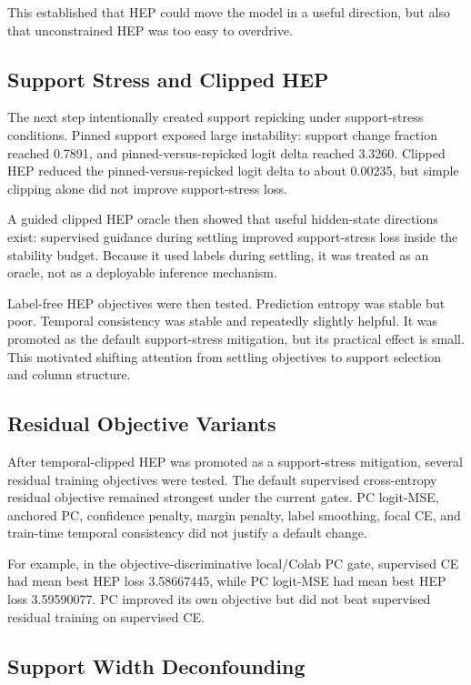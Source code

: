 \documentclass[11pt]{article}
\begin{document}
This established that HEP could move the model in a useful direction, but also
that unconstrained HEP was too easy to overdrive.

\subsection{Support Stress and Clipped HEP}

The next step intentionally created support repicking under support-stress
conditions. Pinned support exposed large instability: support change fraction
reached 0.7891, and pinned-versus-repicked logit delta reached 3.3260.
Clipped HEP reduced the pinned-versus-repicked logit delta to about 0.00235,
but simple clipping alone did not improve support-stress loss.

A guided clipped HEP oracle then showed that useful hidden-state directions
exist: supervised guidance during settling improved support-stress loss inside
the stability budget. Because it used labels during settling, it was treated as
an oracle, not as a deployable inference mechanism.

Label-free HEP objectives were then tested. Prediction entropy was stable but
poor. Temporal consistency was stable and repeatedly slightly helpful. It was
promoted as the default support-stress mitigation, but its practical effect is
small. This motivated shifting attention from settling objectives to support
selection and column structure.

\subsection{Residual Objective Variants}

After temporal-clipped HEP was promoted as a support-stress mitigation, several
residual training objectives were tested. The default supervised
cross-entropy residual objective remained strongest under the current gates.
PC logit-MSE, anchored PC, confidence penalty, margin penalty, label smoothing,
focal CE, and train-time temporal consistency did not justify a default change.

For example, in the objective-discriminative local/Colab PC gate, supervised CE
had mean best HEP loss 3.58667445, while PC logit-MSE had mean best HEP loss
3.59590077. PC improved its own objective but did not beat supervised residual
training on supervised CE.

\subsection{Support Width Deconfounding}
\end{document}
